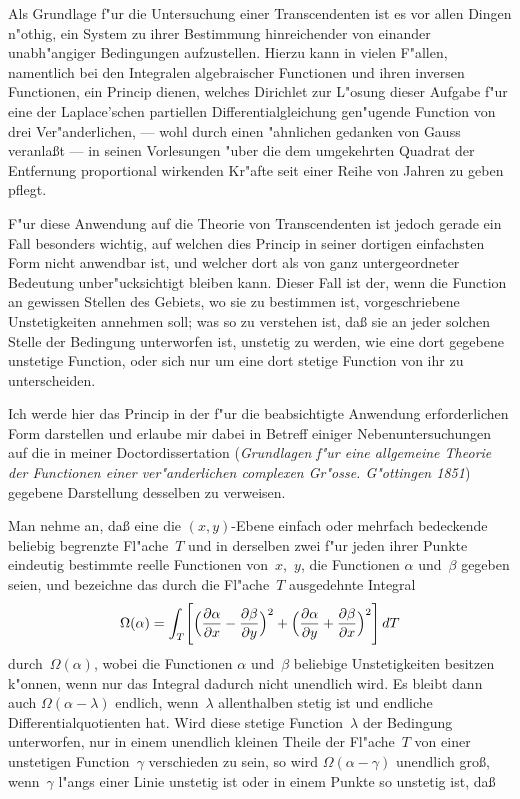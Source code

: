 \documentclass[12pt,a4paper]{article}
\begin{document}
Als Grundlage f"ur die Untersuchung einer Transcendenten ist es vor
allen Dingen n"othig, ein System zu ihrer Bestimmung hinreichender von
einander unabh"angiger Bedingungen aufzustellen. Hierzu kann in vielen
F"allen, namentlich bei den Integralen algebraischer Functionen und ihren
inversen Functionen, ein Princip dienen, welches Dirichlet zur L"osung
dieser Aufgabe f"ur eine der Laplace'schen partiellen Differentialgleichung
gen"ugende Function von drei Ver"anderlichen, --- wohl durch einen "ahnlichen
gedanken von Gauss veranla\ss{}t --- in seinen Vorlesungen "uber die dem
umgekehrten Quadrat der Entfernung proportional wirkenden Kr"afte seit
einer Reihe von Jahren zu geben pflegt.

F"ur diese Anwendung auf die Theorie von Transcendenten ist jedoch
gerade ein Fall besonders wichtig, auf welchen dies Princip in seiner
dortigen einfachsten Form nicht anwendbar ist, und welcher dort als von
ganz untergeordneter Bedeutung unber"ucksichtigt bleiben kann. Dieser
Fall ist der, wenn die Function an gewissen Stellen des Gebiets, wo sie
zu bestimmen ist, vorgeschriebene Unstetigkeiten annehmen soll; was so
zu verstehen ist, da\ss{} sie an jeder solchen Stelle der Bedingung unterworfen
ist, unstetig zu werden, wie eine dort gegebene unstetige Function, oder
sich nur um eine dort stetige Function von ihr zu unterscheiden.

Ich werde hier das Princip in der f"ur die beabsichtigte Anwendung
erforderlichen Form darstellen und erlaube mir dabei in Betreff einiger
Nebenuntersuchungen auf die in meiner Doctordissertation (\textit{Grundlagen
f"ur eine allgemeine Theorie der Functionen einer ver"anderlichen complexen
Gr"osse. G"ottingen 1851}) gegebene Darstellung desselben zu verweisen.

Man nehme an, da\ss{} eine die $(x,y)$-Ebene einfach oder mehrfach
bedeckende beliebig begrenzte Fl"ache~$T$ und in derselben zwei f"ur jeden
ihrer Punkte eindeutig bestimmte reelle Functionen von~$x$,~$y$, die
Functionen $\alpha$ und~$\beta$ gegeben seien, und bezeichne das durch die Fl"ache~$T$
ausgedehnte Integral
\begin{equation}
\label{eq:omega}
\Omega(\alpha) = \int_T\Biggl[\Bigl(\frac{\partial\alpha}{\partial x}
- \frac{\partial\beta}{\partial y}\Bigr)^2 + \Bigl(\frac{\partial\alpha}{\partial y}
+ \frac{\partial\beta}{\partial x}\Bigr)^2\Biggr]\,dT
\end{equation}
durch~$\Omega(\alpha)$, wobei die Functionen $\alpha$ und~$\beta$ beliebige
Unstetigkeiten besitzen k"onnen, wenn nur das Integral dadurch nicht
unendlich wird. Es bleibt dann auch $\Omega(\alpha - \lambda)$ endlich, wenn~$\lambda$
allenthalben stetig ist und endliche Differentialquotienten hat. Wird diese
stetige Function~$\lambda$ der Bedingung unterworfen, nur in einem unendlich
kleinen Theile der Fl"ache~$T$ von einer unstetigen Function~$\gamma$
verschieden zu sein, so wird $\Omega(\alpha - \gamma)$ unendlich gro\ss{}, wenn~$\gamma$
l"angs einer Linie unstetig ist oder in einem Punkte so unstetig ist, da\ss{}
\end{document}
